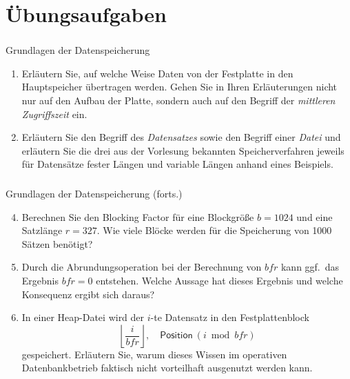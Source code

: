 \section*{Übungsaufgaben}
\begin{frame}[t]
\frametitle{\insertsection}
\begin{alertblock}{Grundlagen der Datenspeicherung}
\begin{enumerate}
	\item Erläutern Sie, auf welche Weise Daten von der Festplatte in den Hauptspeicher übertragen werden.
	Gehen Sie in Ihren Erläuterungen nicht nur auf den Aufbau der Platte, sondern auch auf den Begriff der \textit{mittleren Zugriffszeit} ein.			
	\item Erl\"autern Sie den Begriff des \textit{Datensatzes} sowie den Begriff einer \textit{Datei}
	und erläutern Sie die drei aus der Vorlesung bekannten Speicherverfahren jeweils für Datens\"atze fester L\"angen und variable L\"angen 
	anhand eines Beispiels.			
\end{enumerate}
\end{alertblock}
\end{frame}

\begin{frame}[t]
\frametitle{\insertsection}	
\begin{alertblock}{Grundlagen der Datenspeicherung (forts.)}
\begin{enumerate}
\setcounter{enumi}{3}
\item Berechnen Sie den Blocking Factor für eine Blockgröße $b=1024$ und eine Satzlänge $r=327$.  
Wie viele Bl\"ocke werden für die Speicherung von 1000 S\"atzen ben\"otigt?
\item Durch die Abrundungsoperation bei der Berechnung von $\mathit{bfr}$ kann ggf.~das Ergebnis $\mathit{bfr}=0$ entstehen. 
Welche Aussage hat dieses Ergebnis und welche Konsequenz ergibt sich daraus?
\item In einer Heap-Datei wird der $i$-te Datensatz in den Festplattenblock
$$\left\lfloor{\frac{i}{\mathit{bfr}}}\right\rfloor,\quad \mathsf{Position~} (i \bmod \mathit{bfr})$$
gespeichert. Erl\"autern Sie, warum dieses Wissen im operativen Datenbankbetrieb faktisch nicht vorteilhaft ausgenutzt werden kann.
\end{enumerate}
\end{alertblock}
\end{frame}
